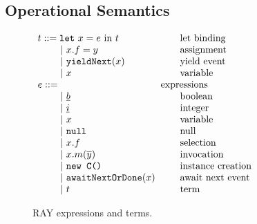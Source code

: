 \documentclass{acm_proc_article-sp}
\newcommand{\gap}{\quad\quad}
\newcommand{\ba}{\begin{array}}
\newcommand{\ea}{\end{array}}
\newcommand{\seq}[1]{\overline{#1}}
\begin{document}
\subsection{Operational Semantics}

\begin{figure}
  \centering
$\ba[t]{l@{\hspace{2mm}}l}
t    ::=  \texttt{let}~x = e~\mbox{in}~t                 & \gap\mbox{let binding}  \\
\gap ~|~ x.f = y                                         & \gap\mbox{assignment}   \\
\gap ~|~ \texttt{yieldNext}(x)                           & \gap\mbox{yield event}  \\
\gap ~|~ x                                               & \gap\mbox{variable}     \\
e    ::=                                                 & \mbox{expressions}      \\
\gap ~|~ \uline{b}                                       & \gap\mbox{boolean}      \\
\gap ~|~ \uline{i}                                       & \gap\mbox{integer}      \\
\gap ~|~ x                                               & \gap\mbox{variable}     \\
\gap ~|~ \texttt{null}                                        & \gap\mbox{null}          \\
\gap ~|~ x.f                                             & \gap\mbox{selection}    \\
\gap ~|~ x.m(\seq{y})                                    & \gap\mbox{invocation}   \\
\gap ~|~ \texttt{new C()}                                & \gap\mbox{instance creation}   \\
\gap ~|~ \texttt{awaitNextOrDone}(x)                     & \gap\mbox{await next event}   \\
\gap ~|~ t                                               & \gap\mbox{term}         \\
\ea$
  \caption{RAY expressions and terms.}
  \label{fig:lang-syntax-2}
\end{figure}
\end{document}
